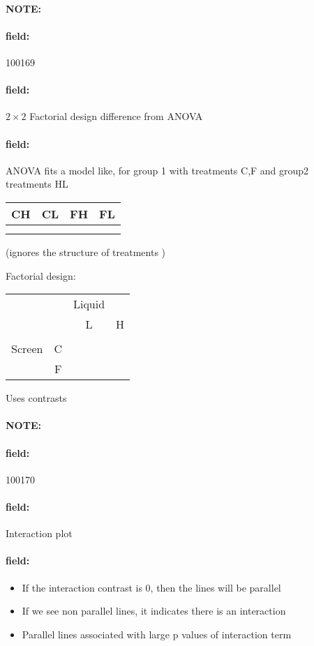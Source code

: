 \documentclass[12pt]{article}
\newenvironment{note}{\paragraph{NOTE:}}{}
\newenvironment{field}{\paragraph{field:}}{}
\begin{document}
\begin{note}
    \begin{field}
        \tiny 100169
    \end{field}
    \begin{field}
        $2\times 2$ Factorial design difference from ANOVA
    \end{field}
    \begin{field}
        ANOVA fits a model like, for group 1 with treatments C,F and group2 treatments HL
        \begin{tabular}{|c |c |c |c |}
          CH & CL & FH & FL \\
          \hline \\
          & & & \\
          \hline
        \end{tabular}

(ignores the structure of treatments )

Factorial design:
\begin{tabular}{c|c|c|c|}
  & & Liquid & \\
  & & L & H \\
  \hline \\
  Screen & C & & \\
  & F & & \\
  \hline
\end{tabular}

Uses contrasts
    \end{field}
\end{note}


\begin{note}
    \begin{field}
        \tiny 100170
    \end{field}
    \begin{field}
        Interaction plot
    \end{field}
    \begin{field}
        \begin{itemize}
          \item If the interaction contrast is 0, then the lines will be parallel
          \item If we see non parallel lines, it indicates there is an interaction
          \item Parallel lines associated with large p values of interaction term
        \end{itemize}
    \end{field}
\end{note}
\end{document}
